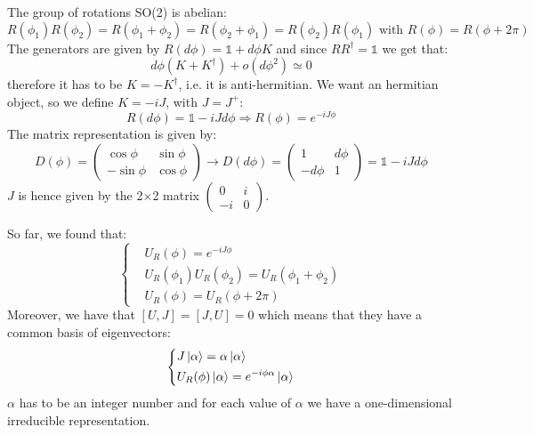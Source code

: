 \documentclass[../main.tex]{subfiles}
\begin{document}
The group of rotations SO(2) is abelian:
\[
R(\phi_1)R(\phi_2)=R(\phi_1+\phi_2)=R(\phi_2+\phi_1)=R(\phi_2)R(\phi_1) \text{ with } R(\phi)=R(\phi+2\pi)
\]
The generators are given by $R(d\phi)=\mathbb{1}+d\phi K$ and since $RR^\dagger=\mathbb{1}$ we get that:
\[
d\phi(K+K^\dagger)+o(d\phi^2)\simeq0
\]
therefore it has to be $K=-K^\dagger$, i.e. it is anti-hermitian. We want an hermitian object, so we define $K=-iJ$, with $J=J^+$:
\[
R(d\phi)=\mathbb{1}-iJd\phi\Rightarrow R(\phi)=e^{-iJ\phi}
\]
The matrix representation is given by:
\[
D(\phi)=\left(\begin{array}{cc}
    \cos\phi & \sin\phi \\
    -\sin\phi & \cos\phi
    \end{array}\right)\xrightarrow[]{}D(d\phi)=\left(\begin{array}{cc}
    1 & d\phi \\
    -d\phi & 1
    \end{array}\right)=\mathbb{1}-iJd\phi
\]
$J$ is hence given by the 2$\times$2 matrix $\left(\begin{array}{cc}
    0 & i \\
    -i & 0
    \end{array}\right)$.

So far, we found that:
\[
\left\{
\begin{aligned}
&U_R(\phi)=e^{-iJ\phi}\\
&U_R(\phi_1)U_R(\phi_2)=U_R(\phi_1+\phi_2)\\
&U_R(\phi)=U_R(\phi+2\pi)
\end{aligned}
\right.
\]
Moreover, we have that $[U,J]=[J,U]=0$ which means that they have a common basis of eigenvectors:
\[
\left\{
\begin{aligned}
&J\ket{\alpha}=\alpha\ket{\alpha}\\
&U_R(\phi)\ket{\alpha}=e^{-i\phi\alpha}\ket{\alpha}
\end{aligned}
\right.
\]
$\alpha$ has to be an integer number and for each value of $\alpha$ we have a one-dimensional irreducible representation.
\end{document}
